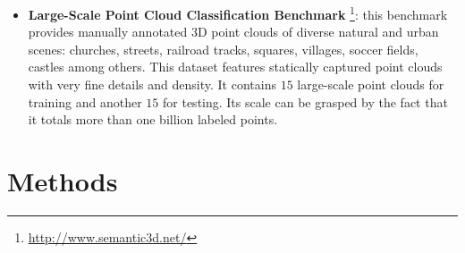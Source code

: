 \begin{itemize}

	\item \textbf{Large-Scale Point Cloud Classification Benchmark} \cite{hackel2016contour}\footnote{\url{http://www.semantic3d.net/}}: this benchmark provides manually annotated 3D point clouds of diverse natural and urban scenes: churches, streets, railroad tracks, squares, villages, soccer fields, castles among others. This dataset features statically captured point clouds with very fine details and density. It contains $15$ large-scale point clouds for training and another $15$ for testing. Its scale can be grasped by the fact that it totals more than one billion labeled points.
\end{itemize}

\section{Methods}
\label{sec:methods}

